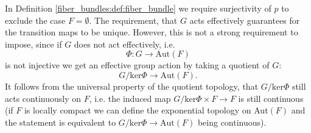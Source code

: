 \begin{remark}
    In Definition \ref{fiber_bundles:def:fiber_bundle} we require surjectivity of $p$ to exclude the case $F = \emptyset$. The requirement, that $G$ acts effectively guarantees for the transition maps to be unique. However, this is not a strong requirement to impose, since if $G$ does not act effectively, i.e.
    \[
    \Phi \colon G \to \mathrm{Aut}(F)
    \]
    is not injective we get an effective group action by taking a quotient of $G$:
    \[
    G/\mathrm{ker}\Phi \to \mathrm{Aut}(F).
    \]
    It follows from the universal property of the quotient topology, that $G/\mathrm{ker}\Phi$ still acts continuously on $F$, i.e. the induced map $G/\mathrm{ker}\Phi \times F \to F$ is still continuous (if $F$ is locally compact we can define the exponential topology on Aut$(F)$ and the statement is equivalent to $G/\mathrm{ker}\Phi \to \mathrm{Aut}(F)$ being continuous).
\end{remark}

